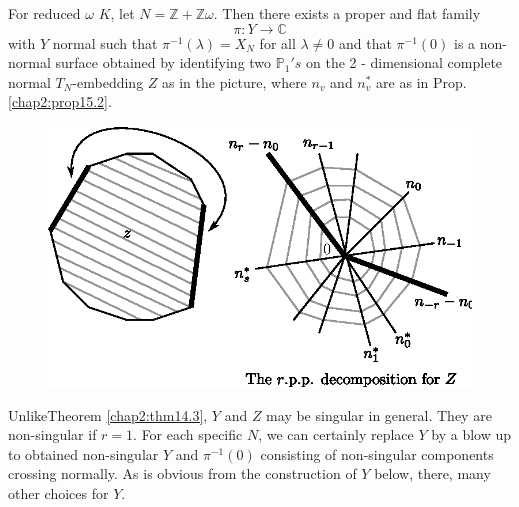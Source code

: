 \setcounter{prop}{6}
\begin{prop}[Makio]\label{chap2:prop15.7}
 For reduced $\omega$ $K$, let $N=\mathbb{Z}+\mathbb{Z} \omega$. Then
 there exists a proper and flat family 
$$
\pi:Y \to \mathbb{C}
$$
with $Y$ normal such that $\pi^{-1}(\lambda)=X_N$ for all $\lambda
\neq 0$ and that $\pi^{-1}(0)$ is a non-normal surface obtained by
identifying two $\mathbb{P}_1 's$ on the 2 - dimensional complete normal
$T_N$-embedding $Z$ as in the picture, where $n_v$ and $n^*_v$ are as
in Prop. \ref{chap2:prop15.2}. 
\begin{figure}[H]
\centering 
\includegraphics{vol58-fig/fig58-82.eps} 
\end{figure}
\end{prop}

\begin{remark*}
Unlike\pageoriginale Theorem \ref{chap2:thm14.3}, $Y$ and $Z$ may be
singular in 
general. They are non-singular if $r=1$. For each specific $N$, we can
certainly replace $Y$ by a blow up to obtained non-singular $Y$ and
$\pi^{-1}(0)$ consisting of non-singular components crossing
normally. As is obvious from the construction of $Y$ below, there,
many other choices for $Y$.     
\end{remark*}

